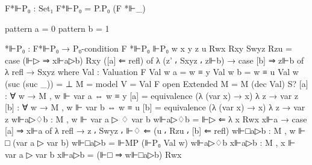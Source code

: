 \begin{spverbatim}
  F*⊩P₀ : Set₁
  F*⊩P₀ = P.P₀ (F *⊩_)

  pattern a = 0
  pattern b = 1

  *⊩P₀ : F*⊩P₀ → P₀-condition F
  *⊩P₀ ⊩P₀ {w} {x} {y} {z} {u} Rwx Rxy Swyz Rzu = case (⊩▷ ⇒ x⊩a▷b) Rxy ([a] ⇐ refl) of
    λ { (z' ⸴ Sxyz ⸴ z⊩b) → case [b] ⇒ z⊩b of λ {refl → Sxyz}}
    where
    Val : Valuation F
    Val w a = w ≡ y
    Val w b = w ≡ u
    Val w (suc (suc _)) = ⊥
    M = model {V = Val} F
    open Extended {M = M} (dec Val) S?
    [a] : ∀ {w} → M , w ⊩ var a ⇔ w ≡ y
    [a] = equivalence (λ { (var x) → x}) λ {z → var z}
    [b] : ∀ {w} → M , w ⊩ var b ⇔ w ≡ u
    [b] = equivalence (λ { (var x) → x}) λ {z → var z}
    w⊩a▷♢b : M , w ⊩ var a ▷ ♢ var b
    w⊩a▷♢b = ⊩▷ ⇐ λ { {x} Rwx x⊩a → case [a] ⇒ x⊩a of
      λ { refl → z ⸴ Swyz ⸴ ⊩♢ ⇐ (u ⸴ Rzu ⸴ [b] ⇐ refl)} }
    w⊩□a▷b : M , w ⊩ □ (var a ▷ var b)
    w⊩□a▷b = ⊩MP (⊩P₀ Val w) w⊩a▷♢b
    x⊩a▷b : M , x ⊩ var a ▷ var b
    x⊩a▷b = (⊩□ ⇒ w⊩□a▷b) Rwx
\end{spverbatim}
